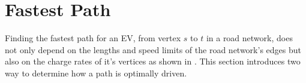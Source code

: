 \section{Fastest Path}

Finding the fastest path for an EV, from vertex $s$ to $t$ in a road network, does not only depend on the lengths and speed limits of the road network's edges but also on the charge rates of it's vertices as shown in . This section introduces two way to determine how a path is optimally driven. 